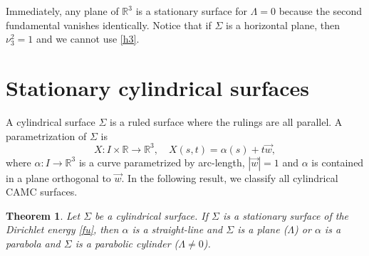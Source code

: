 \documentclass[12pt,a4paper,reqno]{amsart}
\def\r{\mathbb R}
\newtheorem{theorem}{Theorem}[section]
\begin{document}
Immediately,    any plane of $\r^3$ is a stationary surface   for $\Lambda=0$ because  the second fundamental vanishes identically.   Notice that if $\Sigma$ is a horizontal plane, then $\nu_3^2=1$ and we cannot use \eqref{h3}. 
 
 
\section{Stationary cylindrical surfaces } \label{s3}

A cylindrical surface $\Sigma$ is a   ruled surface where   the rulings are all parallel. A parametrization of $\Sigma$ is 
\begin{equation}\label{para2}
X\colon I\times\r\to\r^3,\quad X(s,t)=\alpha(s)+t\vec{w},
\end{equation}
where $\alpha \colon I\to\r^3$ is a   curve  parametrized by arc-length, $|\vec{w}|=1$ and $\alpha$ is contained in a plane orthogonal to $\vec{w}$.  In the following result, we classify all cylindrical CAMC surfaces.   

\begin{theorem} \label{t2}
Let $\Sigma$ be a cylindrical surface. If $\Sigma$ is a stationary surface of the Dirichlet energy \eqref{fu}, then $\alpha$ is a straight-line and $\Sigma$ is a plane ($\Lambda$) or $\alpha$ is a parabola and $\Sigma$ is a parabolic cylinder ($\Lambda\not=0$).
\end{theorem}
\end{document}
